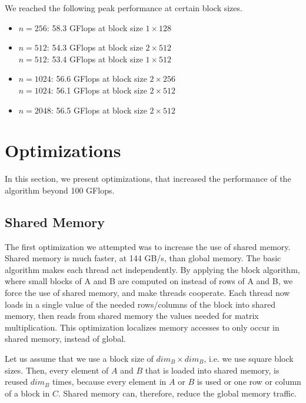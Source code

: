 \documentclass[12pt]{article}
\begin{document}
\noindent We reached the following peak performance at certain block sizes.
\begin{itemize}
	\item $n=256$: 58.3 GFlops at block size $1 \times 128$
    \item $n=512$: 54.3 GFlops at block size $2 \times 512$ \\
          $n=512$: 53.4 GFlops at block size $1 \times 512$
    \item $n=1024$: 56.6 GFlops at block size $2 \times 256$ \\
          $n=1024$: 56.1 GFlops at block size $2 \times 512$
   	\item $n=2048$: 56.5 GFlops at block size $2 \times 512$
\end{itemize}

\section{Optimizations}
In this section, we present optimizations, that increased the performance of the algorithm beyond 100 GFlops.

\subsection{Shared Memory}
The first optimization we attempted was to increase the use of shared memory. Shared memory is much faster, at 144 GB/s, than global memory. The basic algorithm makes each thread act independently. By applying the block algorithm, where small blocks of A and B are computed on instead of rows of A and B, we force the use of shared memory, and make threads cooperate. Each thread now loads in a single value of the needed rows/columns of the block into shared memory, then reads from shared memory the values needed for matrix multiplication. This optimization localizes memory accesses to only occur in shared memory, instead of global. 

Let us assume that we use a block size of $\mathit{dim}_B \times \mathit{dim}_B$, i.e. we use square block sizes. Then, every element of $A$ and $B$ that is loaded into shared memory, is reused $\mathit{dim}_B$ times, because every element in $A$ or $B$ is used or one row or column of a block in $C$. Shared memory can, therefore, reduce the global memory traffic.
\end{document}
